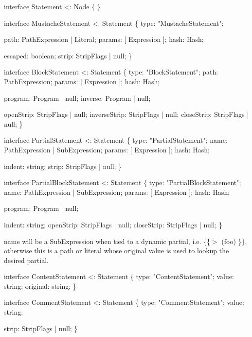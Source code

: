 \begin{DoxyCode}
\textcolor{keyword}{interface }Statement <: Node \{ \}

\textcolor{keyword}{interface }MustacheStatement <: Statement \{
    type: \textcolor{stringliteral}{"MustacheStatement"};

    path: PathExpression | Literal;
    params: [ Expression ];
    hash: Hash;

    escaped: boolean;
    strip: StripFlags | null;
\}

\textcolor{keyword}{interface }BlockStatement <: Statement \{
    type: \textcolor{stringliteral}{"BlockStatement"};
    path: PathExpression;
    params: [ Expression ];
    hash: Hash;

    program: Program | null;
    inverse: Program | null;

    openStrip: StripFlags | null;
    inverseStrip: StripFlags | null;
    closeStrip: StripFlags | null;
\}

\textcolor{keyword}{interface }PartialStatement <: Statement \{
    type: \textcolor{stringliteral}{"PartialStatement"};
    name: PathExpression | SubExpression;
    params: [ Expression ];
    hash: Hash;

    indent: string;
    strip: StripFlags | null;
\}

\textcolor{keyword}{interface }PartialBlockStatement <: Statement \{
    type: \textcolor{stringliteral}{"PartialBlockStatement"};
    name: PathExpression | SubExpression;
    params: [ Expression ];
    hash: Hash;

    program: Program | null;

    indent: string;
    openStrip: StripFlags | null;
    closeStrip: StripFlags | null;
\}
\end{DoxyCode}


{\ttfamily name} will be a {\ttfamily Sub\+Expression} when tied to a dynamic partial, i.\+e. {\ttfamily \{\{$>$ (foo) \}\}}, otherwise this is a path or literal whose {\ttfamily original} value is used to lookup the desired partial.


\begin{DoxyCode}
\textcolor{keyword}{interface }ContentStatement <: Statement \{
    type: \textcolor{stringliteral}{"ContentStatement"};
    value: string;
    original: string;
\}

\textcolor{keyword}{interface }CommentStatement <: Statement \{
    type: \textcolor{stringliteral}{"CommentStatement"};
    value: string;

    strip: StripFlags | null;
\}
\end{DoxyCode}



